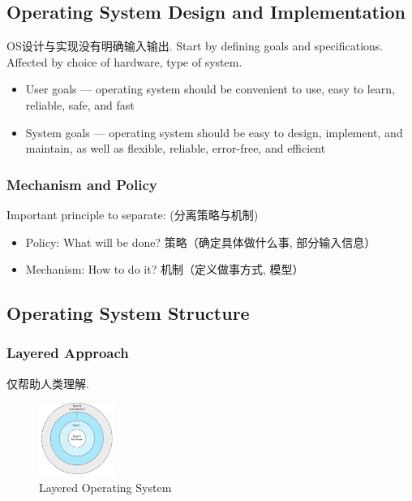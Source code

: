 \subsection{Operating System Design and Implementation}
OS设计与实现没有明确输入输出. Start by defining goals and specifications. Affected by choice of hardware, type of system. 

\begin{itemize}
    \item User goals --- operating system should be convenient to use, easy to learn, reliable, safe, and fast
    \item System goals --- operating system should be easy to design, implement, and maintain, as well as flexible, reliable, error-free, and efficient
\end{itemize}


\subsubsection{Mechanism and Policy} %
Important principle to separate: (分离策略与机制)
\begin{itemize}
    \item Policy: What will be done? 策略（确定具体做什么事, 部分输入信息）
    \item Mechanism: How to do it? 机制（定义做事方式, 模型）
\end{itemize}

\subsection{Operating System Structure}

\subsubsection{Layered Approach}
仅帮助人类理解. 
\begin{figure}[!htb]
    \centering
    \includegraphics[width=0.22\textwidth]{pic/OS2/Layered Operating System}
    \caption{Layered Operating System}
\end{figure}

